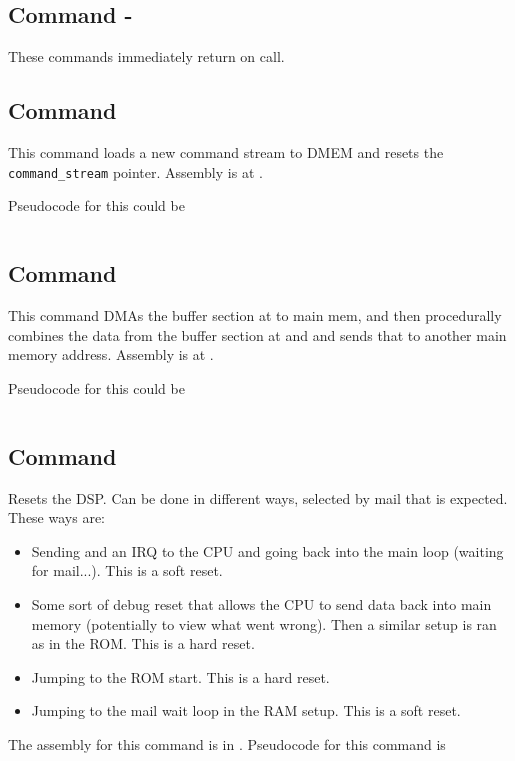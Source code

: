 \subsection{Command  - }
These commands immediately return on call.

\subsection{Command }
This command loads a new command stream to DMEM and resets the \texttt{command_stream} pointer. Assembly is at .

Pseudocode for this could be 

\inputminted{c}{../ucode/command_d.c}

\subsection{Command }
This command DMAs the buffer section at  to main mem, and then procedurally combines the data from the buffer section at  and  and sends that to another main memory address. Assembly is at .

Pseudocode for this could be 

\inputminted{c}{../ucode/command_e.c}

\subsection{Command }
Resets the DSP. Can be done in different ways, selected by mail that is expected. These ways are:

\begin{itemize}
    \item Sending  and an IRQ to the CPU and going back into the main loop (waiting for  mail...). This is a soft reset.
    \item Some sort of debug reset that allows the CPU to send data back into main memory (potentially to view what went wrong). Then a similar setup is ran as in the ROM. This is a hard reset.
    \item Jumping to the ROM start. This is a hard reset.
    \item Jumping to the  mail wait loop in the RAM setup. This is a soft reset.
\end{itemize}

The assembly for this command is in . Pseudocode for this command is 


